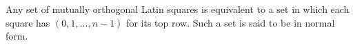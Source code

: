 Any set of mutually orthogonal Latin squares is equivalent to a set in which each square has $(0, 1, \dots, n-1)$ for its top row. Such a set is said to be in normal form.
